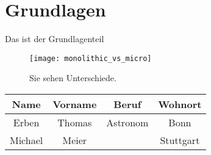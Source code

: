 
\section{Grundlagen}
Das ist der Grundlagenteil

%
%

\begin{figure}[ht]
	\centering
	\texttt{[image: monolithic\_vs\_micro]}
	\caption{Sie sehen Unterschiede.\cite{xxxx}}
	\label{fig:trigo_funk}
\end{figure}

\begin{center}
	\begin{tabular}{|c|c|c|c|}
		Name & Vorname & Beruf & Wohnort \\
		\hline
		Erben & Thomas & Astronom & Bonn  \\
		Michael & Meier & & Stuttgart  \\
	\end{tabular}
\end{center}